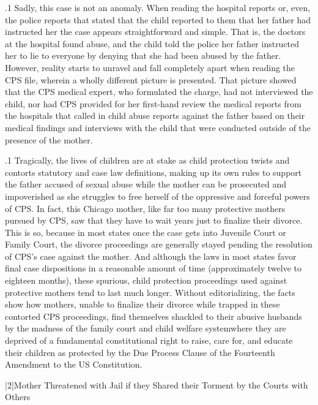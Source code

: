 \documentclass[11pt, twoside]{article}
\begin{document}
{\p.1{%
Sadly, this case is not an anomaly. When reading the hospital reports
or, even, the police reports that stated that the child reported to them
that her father had instructed her  the case appears straightforward and simple.
That is, the doctors at the hospital found abuse, and the child told the
police her father instructed her to lie to everyone by denying that she
had been abused by the father. However, reality starts to unravel and fall
completely apart when reading the CPS file, wherein a wholly different
picture is presented. That picture showed that the CPS medical expert,
who formulated the  charge, had not interviewed
the child, nor had CPS provided for her first-hand review the medical
reports from the hospitals that called in child abuse reports against the
father based on their medical findings and interviews with the child that
were conducted outside of the presence of the mother.
}%

\p.1{%
Tragically, the lives of children are at stake as child protection twists
and contorts statutory and case law definitions, making up its own rules
to support the father accused of sexual abuse while the mother can
be prosecuted and impoverished as she struggles to free herself of the
oppressive and forceful powers of CPS. In fact, this Chicago mother,
like far too many protective mothers pursued by CPS, saw that they have
to wait years just to finalize their divorce. This is so, because in most
states once the case gets into Juvenile Court or Family Court, the divorce proceedings are generally stayed pending the resolution of CPS's
case against the mother. And although the laws in most states favor
final case dispositions in a reasonable amount of time (approximately
twelve to eighteen months), these spurious,  child protection proceedings used against protective mothers tend to last much
longer. Without editorializing, the facts show how mothers, unable to
finalize their divorce while trapped in these contorted CPS proceedings, find themselves shackled to their abusive husbands by the madness
of the family court and child welfare system\mdash{}where they are deprived
of a fundamental constitutional right to raise, care for, and educate
their children as protected by the Due Process Clause of the Fourteenth
Amendment to the US Constitution.
}%


\s|2|{Mother Threatened with Jail if they Shared their Torment by the Courts with Others}

}
\end{document}
